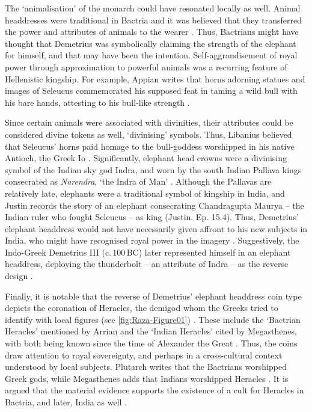 \documentclass{ijsra}
\renewcommand\BC{{\,BC\xspace}}
\begin{document}
The ‘animalisation’ of the monarch could have resonated locally as well. Animal headdresses were traditional in Bactria and it was believed that they transferred the power and attributes of animals to the wearer \parencite[215--226]{Lerner2009}.
Thus, Bactrians might have thought that Demetrius was symbolically claiming the strength of the elephant for himself, and that may have been the intention.
Self-aggrandisement of royal power through approximation to powerful animals was a recurring feature of Hellenistic kingship.
For example, Appian writes that horns adorning statues and images of Seleucus commemorated his supposed feat in taming a wild bull with his bare hands,
attesting to his bull-like strength .

Since certain animals were associated with divinities, their attributes could be considered divine tokens as well, ‘divinising’ symbols.
Thus, Libanius believed that Seleucus’ horns paid homage to the bull-goddess worshipped in his native Antioch, the Greek Io .
Significantly, elephant head crowns were a divinising symbol of the Indian sky god Indra, and worn by the south Indian Pallava kings consecrated as \emph{Narendra}, ‘the Indra of Man’ \parencite[66--70]{Hudson2008}.
Although the Pallavas are relatively late, elephants were a traditional symbol of kingship in India, and Justin records the story of an elephant consecrating Chandragupta Maurya – the Indian ruler who fought Seleucus – as king (Justin. Ep. 15.4).
Thus, Demetrius’ elephant headdress would not have necessarily given affront to his new subjects in India, who might have recognised royal power in the imagery \parencite[465]{Narain2003}.
Suggestively, the Indo-Greek Demetrius III (c.\,100\BC) later represented himself in an elephant headdress, deploying the thunderbolt – an attribute of Indra – as the reverse design \parencite[17--18]{Kalita1997}.  

Finally, it is notable that the reverse of Demetrius’ elephant headdress coin type depicts the coronation of Heracles, the demigod whom the Greeks tried to identify with local figures (see \cref{fig:Raza-Figure01}) \parencites[70--80]{Bukharin2004}[140]{Stanco2012}.
These include the ‘Bactrian Heracles’ mentioned by Arrian and the ‘Indian Heracles’ cited by Megasthenes, with both being known since the time of Alexander the Great .
Thus, the coins draw attention to royal sovereignty, and perhaps in a cross-cultural context understood by local subjects.
Plutarch writes that the Bactrians worshipped Greek gods,
while Megasthenes adds that Indians worshipped Heracles .
It is argued that the material evidence supports the existence of a cult for Heracles in Bactria, and later, India as well \parencite[248]{Stanco2012}. 
\end{document}

